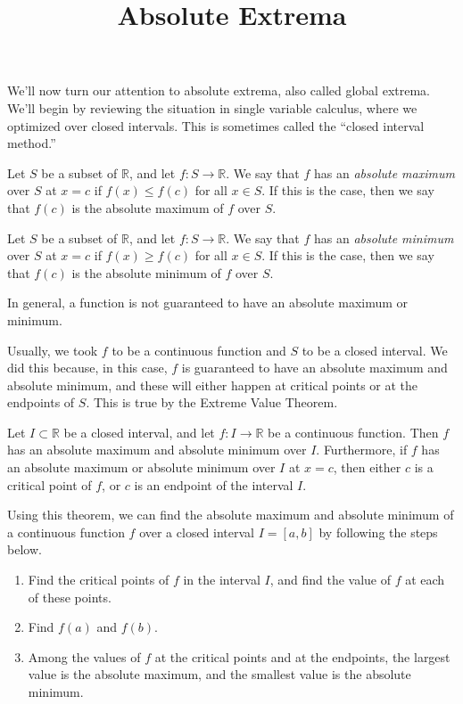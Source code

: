 \documentclass{ximera}
\title{Absolute Extrema}
\begin{document}
\begin{abstract}
\end{abstract}
\maketitle

We'll now turn our attention to absolute extrema, also called global extrema. We'll begin by reviewing the situation in single variable calculus, where we optimized over closed intervals. This is sometimes called the ``closed interval method.''

\begin{definition}
Let $S$ be a subset of $\mathbb{R}$, and let $f:S\rightarrow\mathbb{R}$. We say that $f$ has an \emph{absolute maximum} over $S$ at $x=c$ if $f(x)\leq f(c)$ for all $x\in S$. If this is the case, then we say that $f(c)$ is the absolute maximum of $f$ over $S$.

Let $S$ be a subset of $\mathbb{R}$, and let $f:S\rightarrow\mathbb{R}$. We say that $f$ has an \emph{absolute minimum} over $S$ at $x=c$ if $f(x)\geq f(c)$ for all $x\in S$. If this is the case, then we say that $f(c)$ is the absolute minimum of $f$ over $S$.
\end{definition}

In general, a function is not guaranteed to have an absolute maximum or minimum. 

Usually, we took $f$ to be a continuous function and $S$ to be a closed interval. We did this because, in this case, $f$ is guaranteed to have an absolute maximum and absolute minimum, and these will either happen at critical points or at the endpoints of $S$. This is true by the Extreme Value Theorem.

\begin{theorem}
Let $I\subset \mathbb{R}$ be a closed interval, and let $f:I\rightarrow\mathbb{R}$ be a continuous function. Then $f$ has an absolute maximum and absolute minimum over $I$. Furthermore, if $f$ has an absolute maximum or absolute minimum over $I$ at $x=c$, then either $c$ is a critical point of $f$, or $c$ is an endpoint of the interval $I$.
\end{theorem}

Using this theorem, we can find the absolute maximum and absolute minimum of a continuous function $f$ over a closed interval $I=[a,b]$ by following the steps below.
\begin{enumerate}
\item Find the critical points of $f$ in the interval $I$, and find the value of $f$ at each of these points.
\item Find $f(a)$ and $f(b)$.
\item Among the values of $f$ at the critical points and at the endpoints, the largest value is the absolute maximum, and the smallest value is the absolute minimum.
\end{enumerate}
\end{document}
